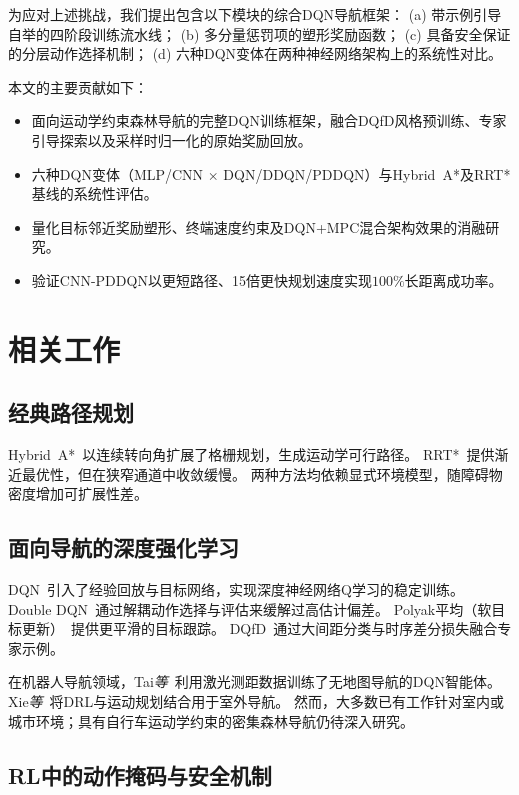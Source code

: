 \documentclass[conference]{IEEEtran}
\newcommand{\etal}{\textit{等}}
\begin{document}
为应对上述挑战，我们提出包含以下模块的综合DQN导航框架：
(a) 带示例引导自举的四阶段训练流水线；
(b) 多分量惩罚项的塑形奖励函数；
(c) 具备安全保证的分层动作选择机制；
(d) 六种DQN变体在两种神经网络架构上的系统性对比。

本文的主要贡献如下：
\begin{itemize}
    \item 面向运动学约束森林导航的完整DQN训练框架，融合DQfD风格预训练、专家引导探索以及采样时归一化的原始奖励回放。
    \item 六种DQN变体（MLP/CNN $\times$ DQN/DDQN/PDDQN）与Hybrid~A*及RRT*基线的系统性评估。
    \item 量化目标邻近奖励塑形、终端速度约束及DQN+MPC混合架构效果的消融研究。
    \item 验证CNN-PDDQN以更短路径、15倍更快规划速度实现$100\%$长距离成功率。
\end{itemize}

\section{相关工作}\label{sec:related}

\subsection{经典路径规划}

Hybrid~A*~\cite{dolgov2010path}以连续转向角扩展了格栅规划，生成运动学可行路径。
RRT*~\cite{karaman2011sampling}提供渐近最优性，但在狭窄通道中收敛缓慢。
两种方法均依赖显式环境模型，随障碍物密度增加可扩展性差。

\subsection{面向导航的深度强化学习}

DQN~\cite{mnih2015human}引入了经验回放与目标网络，实现深度神经网络Q学习的稳定训练。
Double DQN~\cite{van2016deep}通过解耦动作选择与评估来缓解过高估计偏差。
Polyak平均（软目标更新）~\cite{lillicrap2015continuous}提供更平滑的目标跟踪。
DQfD~\cite{hester2018deep}通过大间距分类与时序差分损失融合专家示例。

在机器人导航领域，Tai\etal~\cite{tai2017virtual}利用激光测距数据训练了无地图导航的DQN智能体。
Xie\etal~\cite{xie2018learning}将DRL与运动规划结合用于室外导航。
然而，大多数已有工作针对室内或城市环境；具有自行车运动学约束的密集森林导航仍待深入研究。

\subsection{RL中的动作掩码与安全机制}
\end{document}
